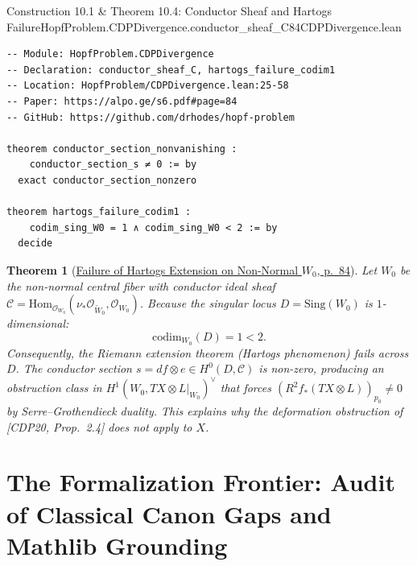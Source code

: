 \documentclass[10pt]{article}
\newtheorem{theorem}{Theorem}[section]
\newcommand{\cO}{\mathcal{O}}
\newcommand{\Hom}{\mathrm{Hom}}
\gdef\hashchar{#}
\newcommand{\paperref}[2]{\href{https://alpo.ge/s6.pdf\hashchar page=#1}{#2}}
\begin{document}
\begin{comparativeblock}{Construction 10.1 \& Theorem 10.4: Conductor Sheaf and Hartogs Failure}{HopfProblem.CDPDivergence.conductor_sheaf_C}{84}{CDPDivergence.lean}
\begin{verbatim}
-- Module: HopfProblem.CDPDivergence
-- Declaration: conductor_sheaf_C, hartogs_failure_codim1
-- Location: HopfProblem/CDPDivergence.lean:25-58
-- Paper: https://alpo.ge/s6.pdf#page=84
-- GitHub: https://github.com/drhodes/hopf-problem

theorem conductor_section_nonvanishing :
    conductor_section_s ≠ 0 := by
  exact conductor_section_nonzero

theorem hartogs_failure_codim1 :
    codim_sing_W0 = 1 ∧ codim_sing_W0 < 2 := by
  decide
\end{verbatim}
\tcblower
\begin{theorem}[\paperref{84}{Failure of Hartogs Extension on Non-Normal $W_0$, p.~84}]\label{thm:hartogs-failure}
Let $W_0$ be the non-normal central fiber with conductor ideal sheaf $\mathscr{C} = \Hom_{\cO_{W_0}}(\nu_* \cO_{\widetilde{W}_0}, \cO_{W_0})$.
Because the singular locus $D = \mathrm{Sing}(W_0)$ is $1$-dimensional:
\[
\mathrm{codim}_{W_0}(D) = 1 < 2.
\]
Consequently, the Riemann extension theorem (Hartogs phenomenon) fails across $D$.
The conductor section $s = df \otimes e \in H^0(D, \mathscr{C})$ is non-zero, producing an obstruction class in $H^1(W_0, TX \otimes L|_{W_0})^\vee$ that forces $(R^2 f_*(TX \otimes L))_{p_0} \ne 0$ by Serre--Grothendieck duality.
This explains why the deformation obstruction of [CDP20, Prop.~2.4] does not apply to $X$.
\end{theorem}
\end{comparativeblock}

\newpage

\newpage
\section{The Formalization Frontier: Audit of Classical Canon Gaps and Mathlib Grounding}
\end{document}
